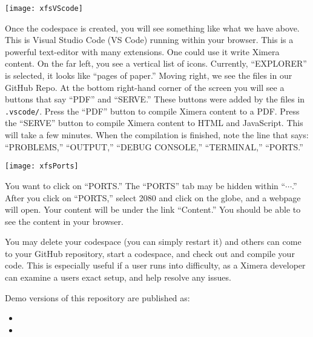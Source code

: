 \documentclass{ximera}
\begin{document}
\begin{image}
    \texttt{[image: xfsVScode]}
\end{image}
        Once the codespace is created, you will see something like what we have
        above.
        This is Visual Studio Code (VS Code) running within your browser. This
        is a powerful text-editor with many extensions. One could use it write Ximera
        content.  On the far left, you see a
        vertical list of icons. Currently, ``EXPLORER'' is selected, it looks
        like
        ``pages of paper.'' Moving right, we see the files in our GitHub Repo.
        At the bottom right-hand corner of the screen you will see a buttons
        that say ``PDF'' and 
        ``SERVE.'' These buttons were added by the files in \verb!.vscode/!.
        Press the ``PDF'' button to compile Ximera content to a PDF. 
        Press the ``SERVE'' button to compile Ximera content to HTML and
        JavaScript.
        This will take a few minutes. When the compilation is finished, note the line that says:
        ``PROBLEMS,'' ``OUTPUT,'' ``DEBUG CONSOLE,'' ``TERMINAL,'' ``PORTS.''
        \pdfOnly{\end{multicols}}

\newpage
 
\begin{image}
    \texttt{[image: xfsPorts]}
\end{image}
You want
to click on ``PORTS.'' The ``PORTS'' tab may be hidden within ``$\cdots$.''
After you click on ``PORTS,'' select 2080 and click on the globe, and a webpage will open. Your
content will be under the link ``Content.'' You should be able to see the
content in your browser.


You may delete your codespace (you can simply restart it) and others can come to your GitHub repository, start a codespace, and check out and compile your code. 
This is especially useful if a user runs into difficulty, as a Ximera developer can examine a users exact setup, and help resolve any issues. 


Demo versions of this repository are published as:
\begin{itemize}
    \item {}
    \item {}
\end{itemize}

\pdfOnly{\end{multicols}}
\pdfOnly{\twocolumn}
\end{document}
